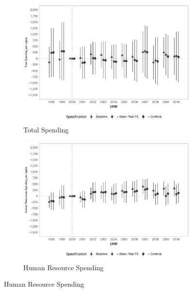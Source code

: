 \begin{figure}[h]
    \begin{center}
    \caption{Causal Effects on Public Spending per capita - By Type}\label{fig:finbra1}
    \begin{subfigure}{0.49\textwidth}
        \caption{\scriptsize Total Spending}\label{fig:finbra1_a}
        \centering
        \includegraphics[width=\textwidth]{plots/spending/finbra_desp_o_pcapita_dist_ec29_baseline_dist_ec29_baseline_full.pdf}
    \end{subfigure}
    \begin{subfigure}{0.49\textwidth}
        \centering
        \caption{\scriptsize Human Resource Spending}\label{fig:finbra1_b}
        \includegraphics[width=\textwidth]{plots/spending/finbra_desp_pessoal_pcapita_dist_ec29_baseline_dist_ec29_baseline_full.pdf}

\end{subfigure}
\end{center}
\end{figure}
